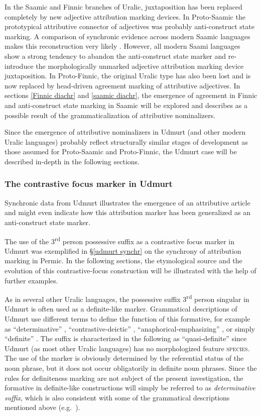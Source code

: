 In the Saamic and Finnic branches of Uralic, juxtaposition has been replaced completely by new adjective attribution marking devices. In Proto-Saamic the prototypical attributive connector of adjectives was probably anti-construct state marking. A comparison of synchronic evidence across modern Saamic languages makes this reconstruction very likely  \citep{riesler2006b}. However, all modern Saami languages show a strong tendency to abandon the anti-construct state marker and re-introduce the morphologically unmarked adjective attribution marking device juxtaposition. In Proto-Finnic, the original Uralic type has also been lost and is now replaced by head-driven agreement marking of attributive adjectives. In sections \ref{Finnic diachr} and \ref{saamic diachr}, the emergence of agreement in Finnic and anti-construct state marking in Saamic will be explored and describes as a possible result of the grammaticalization of attributive nominalizers. 

Since the emergence of attributive nominalizers in Udmurt (and other modern Uralic languages) probably reflect structurally similar stages of development as those assumed for Proto-Saamic and Proto-Finnic, the Udmurt case will be described in-depth in the following sections.

\subsubsection{The contrastive focus marker in Udmurt} \label{udmurt diachr}
Synchronic data from Udmurt illustrates the emergence of an attributive article and might even indicate how this attribution marker has been generalized as an anti-construct state marker. 

The use of the 3\textsuperscript{rd} person possessive suffix as a contrastive focus marker in Udmurt was exemplified in \S\ref{udmurt synchr} on the synchrony of attribution marking in Permic. In the following sections, the etymological source and the evolution of this contrastive-focus construction will be illustrated with the help of further examples.

As in several other Uralic languages, the possessive suffix 3\textsuperscript{rd} person singular in Udmurt is often used as a definite-like marker. Grammatical descriptions of Udmurt use different terms to define the function of this formative, for example as “determinative” \citep{kelmakov-etal1999}, “contrastive-deictic” \citep{alatyrev1970}, “anaphorical-emphasizing” \citep{kiekbaev1965}, or simply “definite” \citep{winkler2001}. The suffix is characterized in the following as “quasi-definite” since Udmurt (as most other Uralic languages) has no morphologized feature \textsc{species}. The use of the marker is obviously determined by the referential status of the noun phrase, but it does not occur obligatorily in definite noun phrases. Since the rules for definiteness marking are not subject of the present investigation, the formative in definite-like constructions will simply be referred to as \textit{determinative suffix}, which is also consistent with some of the grammatical descriptions mentioned above (e.g.~\citealt{kelmakov-etal1999}).

